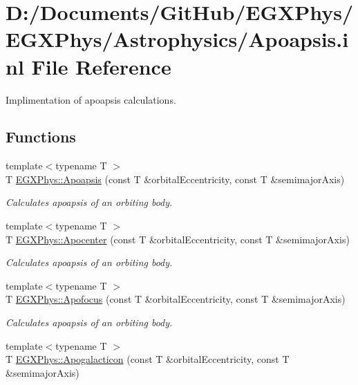 \hypertarget{_apoapsis_8inl}{}\section{D\+:/\+Documents/\+Git\+Hub/\+E\+G\+X\+Phys/\+E\+G\+X\+Phys/\+Astrophysics/\+Apoapsis.inl File Reference}
\label{_apoapsis_8inl}


Implimentation of apoapsis calculations.  


\subsection*{Functions}
\begin{DoxyCompactItemize}
\item 
{\footnotesize template$<$typename T $>$ }\\T \hyperlink{group___astrophysics_gaf962e650bf84a568458e8eb39b1c61ba}{E\+G\+X\+Phys\+::\+Apoapsis} (const T \&orbital\+Eccentricity, const T \&semimajor\+Axis)
\begin{DoxyCompactList}\small\item\em Calculates apoapsis of an orbiting body. \end{DoxyCompactList}\item 
{\footnotesize template$<$typename T $>$ }\\T \hyperlink{group___astrophysics_ga5e51a53e2f974264bada34f159fdc948}{E\+G\+X\+Phys\+::\+Apocenter} (const T \&orbital\+Eccentricity, const T \&semimajor\+Axis)
\begin{DoxyCompactList}\small\item\em Calculates apoapsis of an orbiting body. \end{DoxyCompactList}\item 
{\footnotesize template$<$typename T $>$ }\\T \hyperlink{group___astrophysics_gaa53ac4e15bc6bc0fecf72eadb7a513e0}{E\+G\+X\+Phys\+::\+Apofocus} (const T \&orbital\+Eccentricity, const T \&semimajor\+Axis)
\begin{DoxyCompactList}\small\item\em Calculates apoapsis of an orbiting body. \end{DoxyCompactList}\item 
{\footnotesize template$<$typename T $>$ }\\T \hyperlink{group___astrophysics_ga09b4c7d5e971dc28e1ba37f479958c27}{E\+G\+X\+Phys\+::\+Apogalacticon} (const T \&orbital\+Eccentricity, const T \&semimajor\+Axis)

\end{DoxyCompactItemize}
